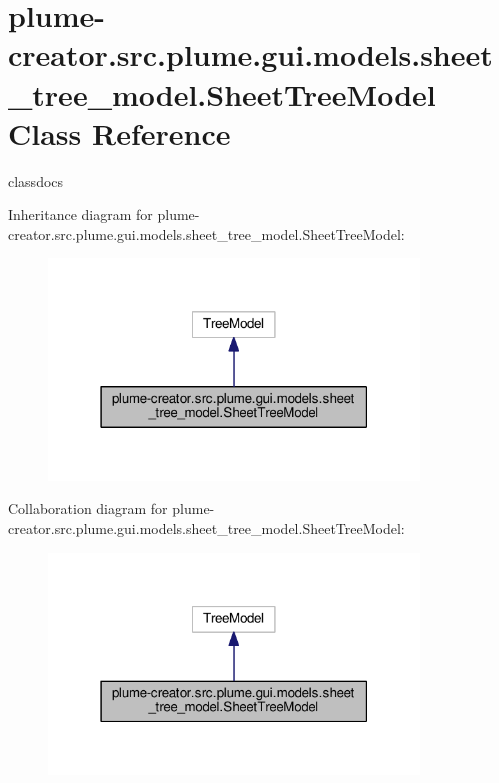 \hypertarget{classplume-creator_1_1src_1_1plume_1_1gui_1_1models_1_1sheet__tree__model_1_1_sheet_tree_model}{}\section{plume-\/creator.src.\+plume.\+gui.\+models.\+sheet\+\_\+tree\+\_\+model.\+Sheet\+Tree\+Model Class Reference}
\label{classplume-creator_1_1src_1_1plume_1_1gui_1_1models_1_1sheet__tree__model_1_1_sheet_tree_model}


classdocs  




Inheritance diagram for plume-\/creator.src.\+plume.\+gui.\+models.\+sheet\+\_\+tree\+\_\+model.\+Sheet\+Tree\+Model\+:\nopagebreak
\begin{figure}[H]
\begin{center}
\leavevmode
\includegraphics[width=279pt]{classplume-creator_1_1src_1_1plume_1_1gui_1_1models_1_1sheet__tree__model_1_1_sheet_tree_model__inherit__graph}
\end{center}
\end{figure}


Collaboration diagram for plume-\/creator.src.\+plume.\+gui.\+models.\+sheet\+\_\+tree\+\_\+model.\+Sheet\+Tree\+Model\+:\nopagebreak
\begin{figure}[H]
\begin{center}
\leavevmode
\includegraphics[width=279pt]{classplume-creator_1_1src_1_1plume_1_1gui_1_1models_1_1sheet__tree__model_1_1_sheet_tree_model__coll__graph}
\end{center}
\end{figure}
